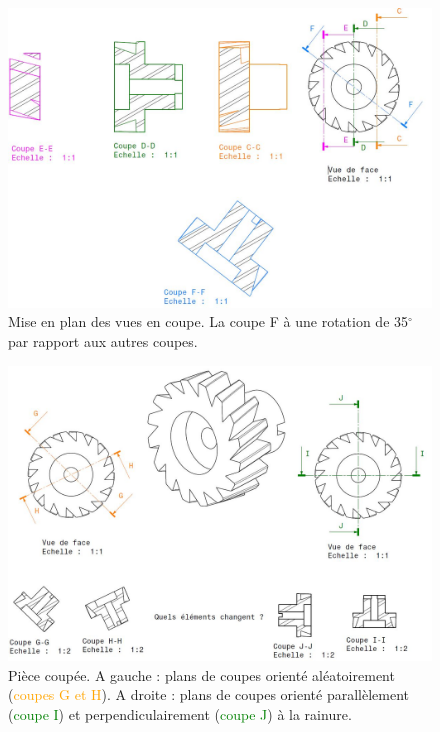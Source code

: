 \documentclass[
	11pt, %
	fleqn, %
	a4paper, %
]{LegrandOrangeBook}
\begin{document}
\begin{figure}[H] %
	\centering %
	\includegraphics[width=1\textwidth]{Images/coupe_couleur.JPG} %
	\caption{Mise en plan des vues en coupe. La coupe F à une rotation de 35$^{\circ}$ par rapport aux autres coupes.}
	\label{Coupe_couleur} %
\end{figure}



\begin{figure}[H] %
	\centering %
	\includegraphics[width=1\textwidth]{Images/orientation.JPG} %
	\caption{Pièce coupée. A gauche : plans de coupes orienté aléatoirement (\textcolor{Orange}{coupes G et H}). A droite : plans de coupes orienté parallèlement (\textcolor{Green}{coupe I}) et perpendiculairement (\textcolor{Green}{coupe J}) à la rainure.}
	\label{Orientation} %
\end{figure}
\end{document}
